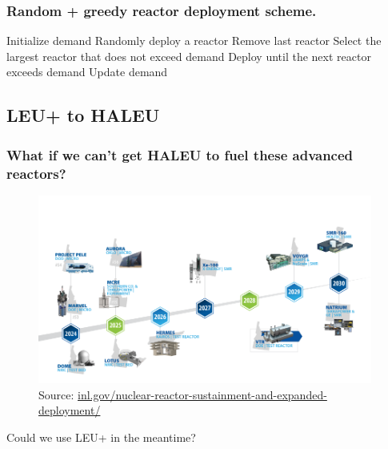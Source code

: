 \documentclass[9pt]{beamer}
\begin{document}
  \begin{frame}
    \frametitle{Random + greedy reactor deployment scheme.}
        \begin{algorithmic}[1]
            \State Initialize demand
                \State Randomly deploy a reactor
                    \State Remove last reactor
                        \State Select the largest reactor that does not exceed demand
                        \State Deploy until the next reactor exceeds demand
                        \State Update demand
                    \EndIf
                \EndIf
            \EndWhile
        \end{algorithmic}
  \end{frame}

  \subsection{LEU+ to HALEU}
  \begin{frame}
    \frametitle{What if we can't get HALEU to fuel these advanced reactors?}
    \vspace{-25pt}
    \begin{figure}
        \centering
        \includegraphics[width=0.98\textwidth]{images/reactor_timeline.png}
        \caption{Source: \url{inl.gov/nuclear-reactor-sustainment-and-expanded-deployment/}}
    \end{figure}
    \vspace{-8pt}
    Could we use LEU+ in the meantime?
  \end{frame}
\end{document}
